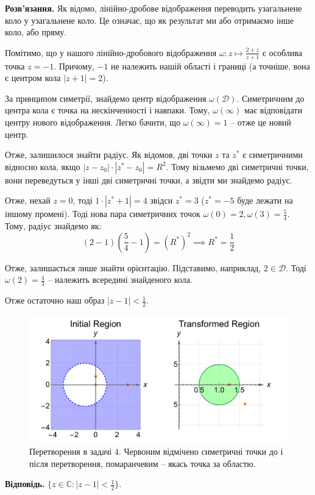 \documentclass[oneside,solution]{karazin-complan-assign}
\begin{document}
\textbf{Розв'язання.} Як відомо, лінійно-дробове відображення переводить узагальнене коло у узагальнене коло. Це означає, що як результат ми або отримаємо інше коло, або пряму. 

Помітимо, що у нашого лінійно-дробового відображення $\omega: z \mapsto \frac{2+z}{z+1}$ є особлива точка $z=-1$. Причому, $-1$ не належить нашій області і границі (а точніше, вона є центром кола $|z+1|=2$).

За принципом симетрії, знайдемо центр відображення $\omega(\mathcal{D})$. Симетричним до центра кола є точка на нескінченності і навпаки. Тому, $\omega(\infty)$ має відповідати центру нового відображення. Легко бачити, що $\omega(\infty)=1$ -- отже це новий центр.

Отже, залишилося знайти радіус. Як відомов, дві точки $z$ та $z^*$ є симетричними відносно кола, якщо $|z-z_0|\cdot|z^*-z_0|=R^2$. Тому візьмемо дві симетричні точки, вони переведуться у інші дві симетричні точки, а звідти ми знайдемо радіус.

Отже, нехай $z=0$, тоді $1 \cdot |z^*+1|=4$ звідси $z^*=3$ ($z^*=-5$ буде лежати на іншому промені). Тоді нова пара симетричних точок $\omega(0)=2, \omega(3)=\frac{5}{4}$. Тому, радіус знайдемо як:
\begin{equation}
    \left(2-1\right)\left(\frac{5}{4}-1\right) = (R^*)^2 \implies R^* = \frac{1}{2}
\end{equation}

Отже, залишається лише знайти орієнтацію. Підставимо, наприклад, $2 \in \mathcal{D}$. Тоді $\omega(2) = \frac{4}{3}$ -- належить всередині знайденого кола.

Отже остаточно наш образ $|z-1|<\frac{1}{2}$.

\begin{figure}
    \centering
    \includegraphics[width=\textwidth]{images/test_2/plot_4.pdf}
    \caption{Перетворення в задачі 4. Червоним відмічено симетричні точки до і після перетворення, помаранчевим -- якась точка за областю.}
    \label{fig:2(1)}
\end{figure}

\textbf{Відповідь.} $\{z \in \mathbb{C}: |z-1|<\frac{1}{2}\}$.
\end{document}

